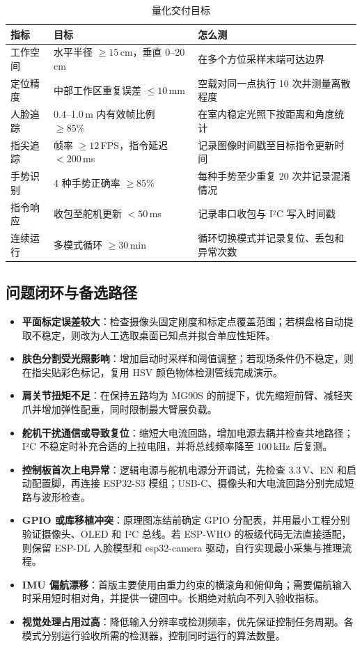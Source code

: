 \begin{table}[h]
\centering
\caption{量化交付目标}
\label{tab:acceptance-targets}
\small
\begin{tabularx}{\linewidth}{l l l}
\toprule
\textbf{指标} & \textbf{目标} & \textbf{怎么测}\\
\midrule
工作空间 & 水平半径 $\geq15$\,cm，垂直 0--20\,cm & 在多个方位采样末端可达边界\\
定位精度 & 中部工作区重复误差 $\leq10$\,mm & 空载对同一点执行 10 次并测量离散程度\\
人脸追踪 & 0.4--1.0\,m 内有效帧比例 $\geq85\%$ & 在室内稳定光照下按距离和角度统计\\
指尖追踪 & 帧率 $\geq12$\,FPS，指令延迟 $<200$\,ms & 记录图像时间戳至目标指令更新时间\\
手势识别 & 4 种手势正确率 $\geq85\%$ & 每种手势至少重复 20 次并记录混淆情况\\
指令响应 & 收包至舵机更新 $<50$\,ms & 记录串口收包与 I²C 写入时间戳\\
连续运行 & 多模式循环 $\geq30$\,min & 循环切换模式并记录复位、丢包和异常次数\\
\bottomrule
\end{tabularx}
\end{table}

\subsection{问题闭环与备选路径}

\begin{itemize}
  \item \textbf{平面标定误差较大}：检查摄像头固定刚度和标定点覆盖范围；若棋盘格自动提取不稳定，则改为人工选取桌面已知点并拟合单应性矩阵。
  \item \textbf{肤色分割受光照影响}：增加启动时采样和阈值调整；若现场条件仍不稳定，则在指尖贴彩色标记，复用 HSV 颜色物体检测管线完成演示。
  \item \textbf{肩关节扭矩不足}：在保持五路均为 MG90S 的前提下，优先缩短前臂、减轻夹爪并增加弹性配重，同时限制最大臂展负载。
  \item \textbf{舵机干扰通信或导致复位}：缩短大电流回路，增加电源去耦并检查共地路径；I²C 不稳定时补充合适的上拉电阻，并将总线频率降至 100\,kHz 后复测。
  \item \textbf{控制板首次上电异常}：逻辑电源与舵机电源分开调试，先检查 3.3\,V、EN 和启动配置脚，再连接 ESP32-S3 模组；USB-C、摄像头和大电流回路分别完成短路与波形检查。
  \item \textbf{GPIO 或库移植冲突}：原理图冻结前确定 GPIO 分配表，并用最小工程分别验证摄像头、OLED 和 I²C 总线。若 ESP-WHO 的板级代码无法直接适配，则保留 ESP-DL 人脸模型和 esp32-camera 驱动，自行实现最小采集与推理流程。
  \item \textbf{IMU 偏航漂移}：首版主要使用由重力约束的横滚角和俯仰角；需要偏航输入时采用短时相对角，并提供一键回中。长期绝对航向不列入验收指标。
  \item \textbf{视觉处理占用过高}：降低输入分辨率或检测频率，优先保证控制任务周期。各模式分别运行验收所需的检测器，控制同时运行的算法数量。
\end{itemize}

